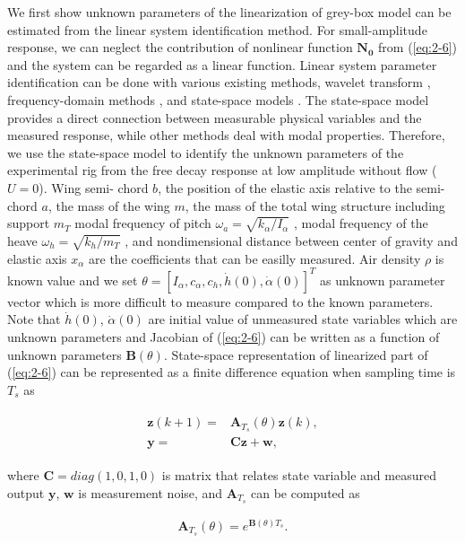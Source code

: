 \documentclass[openacc]{rsproca_new}%
\def\vec#1{\ensuremath{\mathbf{#1}}}
\newcommand{\Eref}[1]{(\ref{#1})}
\begin{document}
We first show unknown parameters of the linearization of grey-box model can be estimated from the linear system identification method. For small-amplitude response, we can neglect the contribution of nonlinear function $\vec{N_0}$ from \Eref{eq:2-6} and the system can be regarded as a linear function. Linear system parameter identification can be done with various existing methods, wavelet transform \cite{ruzzene1997natural}, frequency-domain methods \cite{pintelon2012system}, and state-space models \cite{ljung2001system}. The state-space model provides a direct connection between measurable physical variables and the measured response, while other methods deal with modal properties. Therefore, we use the state-space model to identify the unknown parameters of the experimental rig from the free decay response at low amplitude without flow ($U=0$). Wing semi- chord $b$, the position of the elastic axis relative to the semi-chord $a$, the mass of the wing $m$, the mass of the total wing structure including support $m_T$
modal frequency of pitch $\omega_a=\sqrt{k_\alpha / I_\alpha}$ , modal frequency of the heave $\omega_h=\sqrt{k_h/m_T}$ , and nondimensional distance between center of gravity and elastic axis $x_\alpha$ are the coefficients that can be easilly measured.
Air density $\rho$ is known value and we set $\theta=[I_\alpha,c_\alpha,c_h,\dot h(0),\dot \alpha(0)]^T$ as unknown parameter vector which is more difficult to measure compared to the known parameters. Note that $\dot h(0)$, $\dot \alpha(0)$ are initial value of unmeasured state variables which are unknown parameters and Jacobian of \Eref{eq:2-6} can be written as a function of unknown parameters $\vec{B}(\theta)$. State-space representation of linearized part of \Eref{eq:2-6} can be represented as a finite difference equation when sampling time is $T_s$ as

\begin{align}\label{eq:2-7}
  \begin{split}
\vec{z}(k+1)=&\vec{A}_{T_s}(\theta)\vec{z}(k),\\
\vec{y}=&\vec{C}\vec{z}+\vec{w},
\end{split}
\end{align}

\noindent where $\vec{C}=diag(1,0,1,0)$ is matrix that relates state variable and measured output $\vec{y}$, $\vec{w}$ is measurement noise, and $\vec{A}_{T_s}$ can be computed as

\begin{align}\label{eq:2-8}
\vec{A}_{T_s}(\theta)=e^{\vec{B}(\theta)T_s}.
\end{align}
\end{document}
